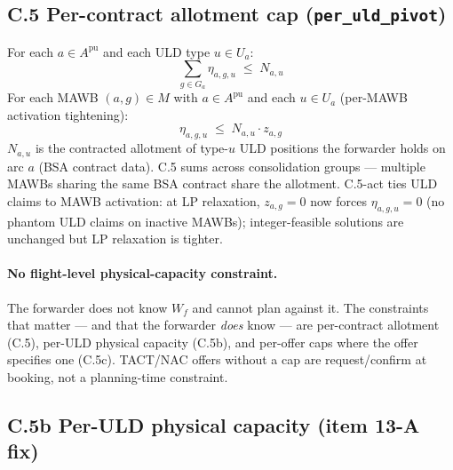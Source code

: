 \documentclass[11pt,a4paper]{article}
\theoremstyle{definition}
\begin{document}
\subsection*{C.5 Per-contract allotment cap (\texttt{per\_uld\_pivot}) }

For each $a \in A^{\text{pu}}$ and each ULD type $u \in U_a$:
\begin{equation}
  \sum_{g \in G_a} \eta_{a,g,u} \;\leq\; N_{a,u}
  \label{eq:C5}
\end{equation}
For each MAWB $(a, g) \in M$ with $a \in A^{\text{pu}}$ and each $u \in U_a$
(per-MAWB activation tightening):
\begin{equation}
  \eta_{a,g,u} \;\leq\; N_{a,u} \cdot z_{a,g}
  \tag{C.5-act} \label{eq:C5-act}
\end{equation}
$N_{a,u}$ is the contracted allotment of type-$u$ ULD positions the forwarder
holds on arc $a$ (BSA contract data). C.5 sums across consolidation groups
--- multiple MAWBs sharing the same BSA contract share the allotment. C.5-act
ties ULD claims to MAWB activation: at LP relaxation, $z_{a,g} = 0$ now
forces $\eta_{a,g,u} = 0$ (no phantom ULD claims on inactive MAWBs);
integer-feasible solutions are unchanged but LP relaxation is tighter.

\paragraph{No flight-level physical-capacity constraint.}
The forwarder does not know $W_f$ and cannot plan against it. The constraints
that matter --- and that the forwarder \emph{does} know --- are per-contract
allotment (C.5), per-ULD physical capacity (C.5b), and per-offer caps where
the offer specifies one (C.5c). TACT/NAC offers without a cap are
request/confirm at booking, not a planning-time constraint.

\subsection*{C.5b Per-ULD physical capacity (item 13-A fix) }
\end{document}
